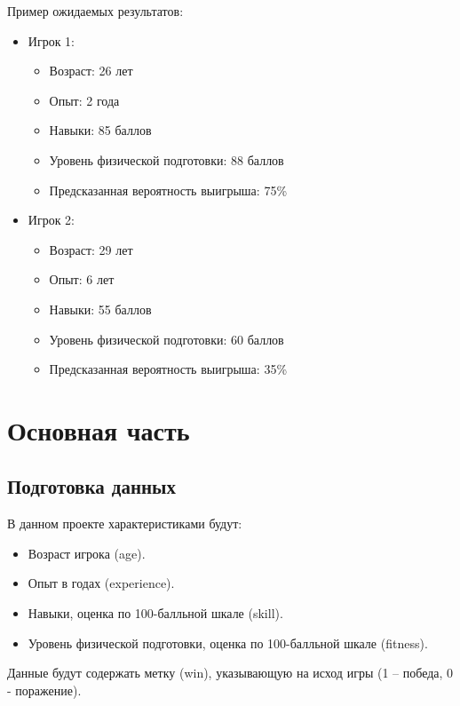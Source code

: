 \documentclass[12pt,a4paper]{article}
\begin{document}
Пример ожидаемых результатов:
\begin{itemize}
    \item Игрок 1:
    \begin{itemize}
        \item Возраст: 26 лет
        \item Опыт: 2 года
        \item Навыки: 85 баллов
        \item Уровень физической подготовки: 88 баллов
        \item Предсказанная вероятность выигрыша: 75\%
    \end{itemize}
    \item Игрок 2:
    \begin{itemize}
        \item Возраст: 29 лет
        \item Опыт: 6 лет
        \item Навыки: 55 баллов
        \item Уровень физической подготовки: 60 баллов
        \item Предсказанная вероятность выигрыша: 35\%
    \end{itemize}
\end{itemize}

\section{Основная часть}
\subsection{Подготовка данных}
В данном проекте характеристиками будут:
\begin{itemize}
    \item Возраст игрока (age).
    \item Опыт в годах (experience).
    \item Навыки, оценка по 100-балльной шкале (skill).
    \item Уровень физической подготовки, оценка по 100-балльной шкале (fitness).
\end{itemize}
Данные будут содержать метку (win), указывающую на исход игры (1 – победа, 0 - поражение).
\end{document}
